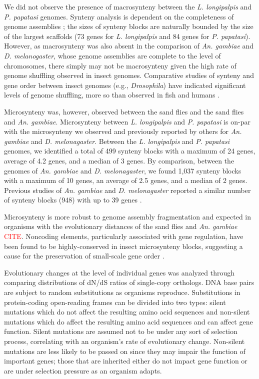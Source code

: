 We did not observe the presence of macrosynteny between the \emph{L. longipalpis} and \emph{P. papatasi} genomes.  Synteny analysis is dependent on the completeness of genome assemblies \cite{Heger2007}; the sizes of synteny blocks are naturally bounded by the size of the largest scaffolds (73 genes for \emph{L. longipalpis} and 84 genes for \emph{P. papatasi}).  However, as macrosynteny was also absent in the comparison of \emph{An. gambiae} and \emph{D. melanogaster}, whose genome assemblies are complete to the level of chromosomes, there simply may not be macrosynteny given the high rate of genome shuffling observed in insect genomes. Comparative studies of synteny and gene order between insect genomes (e.g., \emph{Drosophila}) have indicated significant levels of genome shuffling, more so than observed in fish and humans \cite{Ranz2001,Zdobnov2002,Zdobnov2007}.


Microsynteny was, however, observed between the sand flies and the sand flies and \emph{An. gambiae}. Microsynteny between \emph{L. longipalpis} and \emph{P. papatasi} is on-par with the microsynteny we observed and previously reported by others for \emph{An. gambiae} and \emph{D. melonagaster}.  Between the \emph{L. longipalpis} and \emph{P. papatasi} genomes, we identified a total of 499 synteny blocks with a maximum of 24 genes, average of 4.2 genes, and a median of 3 genes. By comparison, between the genomes of \emph{An. gambiae} and \emph{D. melonagaster}, we found 1,037 synteny blocks with a maximum of 10 genes, an average of 2.5 genes, and a median of 2 genes. Previous studies of \emph{An. gambiae} and \emph{D. melonagaster} reported a similar number of synteny blocks (948) with up to 39 genes \cite{Zdobnov2002}.  

Microsynteny is more robust to genome assembly fragmentation \cite{Zdobnov2002} and expected in organisms with the evolutionary distances of the sand flies and \emph{An. gambiae} \textcolor{red}{CITE}. Noncoding elements, particularly associated with gene regulation, have been found to be highly-conserved in insect microsynteny blocks, suggesting a cause for the preservation of small-scale gene order \cite{Engstrom2007}.

Evolutionary changes at the level of individual genes was analyzed through comparing distributions of dN/dS ratios of single-copy orthologs. DNA base pairs are subject to random substitutions as organisms reproduce.  Substitutions in protein-coding open-reading frames can be divided into two types: silent mutations which do not affect the resulting amino acid sequences and non-silent mutations which do affect the resulting amino acid sequences and can affect gene function.  Silent mutations are assumed not to be under any sort of selection process, correlating with an organism's rate of evolutionary change.  Non-silent mutations are less likely to be passed on since they may impair the function of important genes; those that are inherited either do not impact gene function or are under selection pressure as an organism adapts.

